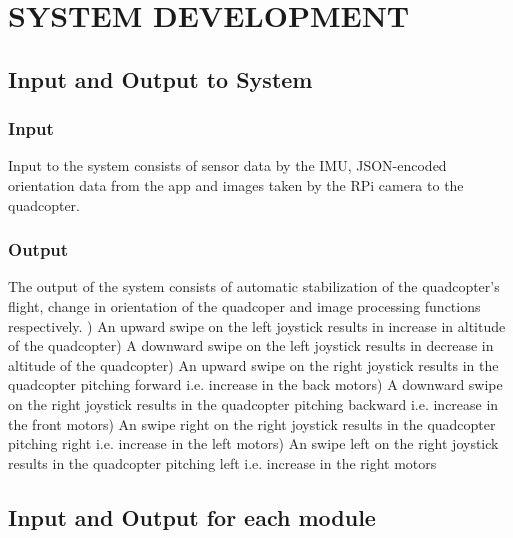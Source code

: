 
\chapter{SYSTEM DEVELOPMENT} %

\section{Input and Output to System}
\subsection{Input}
Input to the system consists of sensor data by the IMU, JSON-encoded orientation data from the app and images taken by the RPi camera to the quadcopter.
\subsection{Output}
The output of the system consists of automatic stabilization of the quadcopter's flight, change in orientation of the quadcoper and image processing functions respectively.
) An upward swipe on the left joystick results in increase in altitude of the quadcopter) A downward swipe on the left joystick results in decrease in altitude of the quadcopter) An upward swipe on the right joystick results in the quadcopter pitching forward i.e. increase in the back motors) A downward swipe on the right joystick results in the quadcopter pitching backward i.e. increase in the front motors) An swipe right on the right joystick results in the quadcopter pitching right i.e. increase in the left motors) An swipe left on the right joystick results in the quadcopter pitching left i.e. increase in the right motors\newline
\section{Input and Output for each module}
